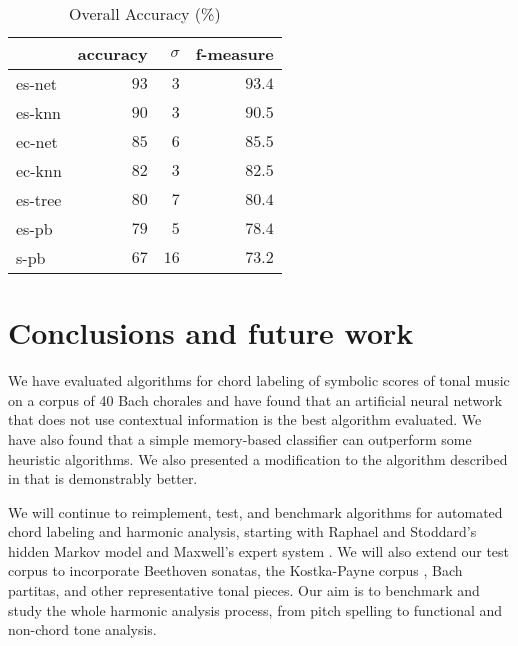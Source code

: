 \documentclass{article}
\begin{document}
\begin{table}
  \centering
  \begin{tabular}{l|rrr}
       & accuracy& $\sigma$  & f-measure\\
\hline
es-net &$   93  $&$  3$      &$93.4$ \\
es-knn &$   90  $&$  3$      &$90.5$ \\
ec-net &$   85  $&$  6$      &$85.5$ \\
ec-knn &$   82  $&$  3$      &$82.5$ \\
es-tree&$   80  $&$  7$      &$80.4$ \\
es-pb  &$   79  $&$  5$      &$78.4$ \\
s-pb   &$   67  $&$ 16$      &$73.2$ \\

  \end{tabular}                                                        


  \caption{Overall Accuracy (\%)}
  \label{tab:accuracy}
\end{table}

\section{Conclusions and future work}
\label{sec:conclusions}

We have evaluated algorithms for chord labeling of symbolic scores of
tonal music on a corpus of 40 Bach chorales and have found that an
artificial neural network that does not use contextual information is
the best algorithm evaluated. We have also found that a simple
memory-based classifier can outperform some heuristic algorithms. We
also presented a modification to the algorithm described in
\cite{barthelemy.ea01:figured} that is demonstrably better.

We will continue to reimplement, test, and benchmark algorithms for
automated chord labeling and harmonic analysis, starting with Raphael
and Stoddard's hidden Markov model \cite{raphael.ea03:harmonic} and
Maxwell's expert system \cite{maxwell92:expert}.  We will also extend
our test corpus to incorporate Beethoven sonatas, the Kostka-Payne
corpus \cite{temperley04:bayesian}, Bach partitas, and other
representative tonal pieces. Our aim is to benchmark and study the
whole harmonic analysis process, from pitch spelling to functional and
non-chord tone analysis.



\end{document}
